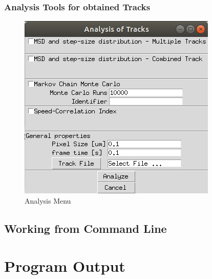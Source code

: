 \documentclass[oneside,letterpaper]{scrartcl}
\def\myscale{0.55}
\begin{document}
\subsubsection{Analysis Tools for obtained Tracks}
\begin{figure}
\centering
\includegraphics[scale=\myscale]{Figures/AnalysisGUI.jpg}
\caption{Analysis Menu}
\end{figure}
\blindtext

\subsection{Working from Command Line}

\section{Program Output}



\end{document}
